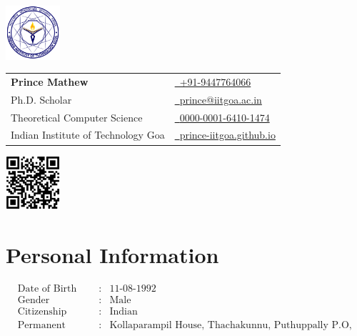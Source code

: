 \documentclass[a4paper,11pt]{article}
\makeatletter
\newcommand{\name}{Prince Mathew} %
\newcommand{\course}{Ph.D. Scholar} %
\newcommand{\phone}{9447764066} %
\newcommand{\emaila}{prince@iitgoa.ac.in} %
\makeatother
\begin{document}
\selectfont


\parbox{2.35cm}{%
\vspace{.3cm}
\includegraphics[width=2cm,clip]{iitgoa.png}
}
\parbox{\dimexpr\linewidth-5.15cm\relax}{
\begin{tabularx}{\linewidth}{L B} \\
  \textbf{\Large \name} & \href{tel:+91 9447 764 066} {\raisebox{0.0\height}{\footnotesize \faPhone}\ +91-\phone}\\
  {\course} & \href{mailto:\emaila}{\raisebox{0.0\height}{\footnotesize \faEnvelope}\ {\emaila}} \\
  Theoretical Computer Science &  \href{https://orcid.org/0000-0001-6410-1474}{\raisebox{0.0\height}{\footnotesize \faOrcid}\ {0000-0001-6410-1474}}\\ 
  {Indian Institute of Technology Goa}  &  \href{https://prince-iitgoa.github.io/}{\raisebox{0.0\height}{\footnotesize \faGithub}\ {prince-iitgoa.github.io}} \\
\end{tabularx}
}
\parbox{2.35cm}{%
\vspace{.5cm}
\includegraphics[width=2cm,clip]{PrinceWebpage.png}
}
\section{{\footnotesize \faUser}\textbf{ Personal Information}}
\vspace{-5.5mm}
{\singlespacing \begin{align*}
&\text{Date of Birth} &:& \text{11-08-1992}\\
&\text{Gender} &:& \text{Male}\\
&\text{Citizenship} &:& \text{Indian}\\
&\text{Permanent Address} &:& \text{Kollaparampil House, Thachakunnu, Puthuppally P.O, Kottayam, PIN - 686011}
\end{align*}}
\vspace{-7.5mm}
\end{document}
